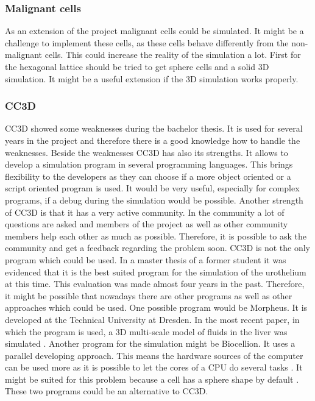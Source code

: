 \subsubsection{Malignant cells}
As an extension of the project malignant cells could be simulated. It might be a challenge to implement these cells, as these cells behave differently from the non-malignant cells. This could increase the reality of the simulation a lot. First for the hexagonal lattice should be tried to get sphere cells and a solid 3D simulation. It might be a useful extension if the 3D simulation works properly.

\subsubsection{\ac{CC3D}}
\ac{CC3D} showed some weaknesses during the bachelor thesis. It is used for several years in the project and therefore there is a good knowledge how to handle the weaknesses. Beside the weaknesses \ac{CC3D} has also its strengths. It allows to develop a simulation program in several programming languages.  This brings flexibility to the developers as they can choose if a more object oriented or a script oriented program is used. It would be very useful, especially for complex programs, if a debug during the simulation would be possible. Another strength of \ac{CC3D} is that it has a very active community. In the community a lot of questions are asked and members of the project as well as other community members help each other as much as possible. Therefore, it is possible to ask the community and get a feedback regarding the problem soon. \newline
\ac{CC3D} is not the only program which could be used. In a master thesis of a former student it was evidenced that it is the best suited program for the simulation of the urothelium \cite{MSCAngelo} at this time. This evaluation was made almost four years in the past. Therefore, it might be possible that nowadays there are other programs as well as other approaches which could be used. One possible program would be Morpheus. It is developed at the Technical University at Dresden. In the most recent paper, in which the program is used, a 3D multi-scale model of fluids in the liver was simulated \cite{Meyer2017}. Another program for the simulation might be Biocellion. It uses a parallel developing approach. This means the hardware sources of the computer can be used more as it is possible to let the cores of a CPU do several tasks \cite{Kang2014}. It might be suited for this problem because a cell has a sphere shape by default \cite{Kang2014}. These two programs could be an alternative to \ac{CC3D}. \newline
